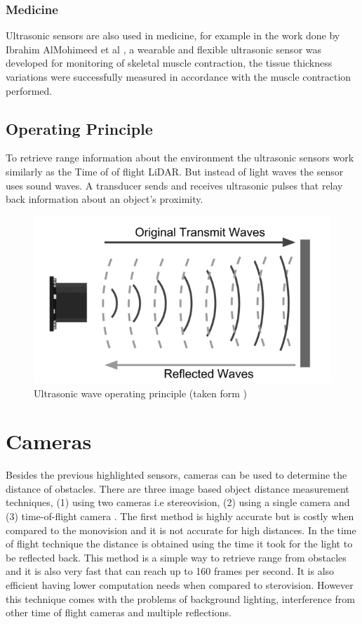\subsubsection{Medicine}
Ultrasonic sensors are also used in medicine, for example in the work done by Ibrahim AlMohimeed et al \cite{med}, a wearable and flexible ultrasonic sensor was developed for monitoring of skeletal muscle contraction, the tissue thickness variations were successfully measured in accordance with the muscle contraction performed. 
\subsection{Operating Principle}
To retrieve range information about the environment the ultrasonic sensors work similarly as the  Time of of flight \ac{LiDAR}. But instead of light waves the sensor uses sound waves. A transducer sends and receives ultrasonic pulses that relay back information about an object’s proximity.  

\begin{figure}[ht] 
\centerline{\includegraphics [width=0.8 \textwidth]{imgs/chapter2/us.png}}
\caption[Ultrasonic wave operating principle]{Ultrasonic wave operating principle (taken form \cite{burnett2019})}
\label{fig:us}
\end{figure}

\section{Cameras}
Besides the previous highlighted sensors, cameras can be used to determine the distance of obstacles. There are three image based object distance measurement techniques, (1) using two cameras i.e stereovision, (2) using a single camera and (3) time-of-flight camera \cite{cam}.
The first method is highly accurate but is costly when compared to the monovision and it is not accurate for high distances. In the time of flight technique the distance is obtained using the time it took for the light to be reflected back. This method is a simple way to retrieve range from obstacles and it is also very fast that can reach up to 160 frames per second. It is also efficient having lower computation needs when compared to sterovision. However this technique comes with the problems of background lighting, interference from other time of flight cameras and multiple reflections. 
